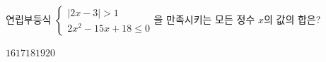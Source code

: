 연립부등식 $\begin{cases} |2x-3|>1 \\ 2x^2-15x+18\le 0 \end{cases}$을 만족시키는 모든 정수 $x$의 값의 합은?
\begin{choices32}{$16$}{$17$}{$18$}{$19$}{$20$}\end{choices32}
